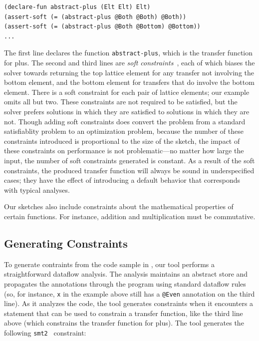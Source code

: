\documentclass[10pt,conference]{IEEEtran}
\begin{document}
\lstset{language=[]Lisp}
\begin{lstlisting}[columns=fullflexible]
(declare-fun abstract-plus (Elt Elt) Elt)
(assert-soft (= (abstract-plus @Both @Both) @Both))
(assert-soft (= (abstract-plus @Both @Bottom) @Bottom))
...
\end{lstlisting}
\lstset{language=C}

The first line declares the function \lstinline{abstract-plus}, which
is the transfer function for plus. The second and third lines are
\textit{soft constraints}~\cite{bjorner2015nuz},
each of which biases the solver towards returning the top lattice
element for any transfer not involving the bottom element, and the
bottom element for transfers that do involve the bottom element.
There is a soft constraint for each pair of lattice elements; our
example omits all but two.  These constraints are not required to be
satisfied, but the solver prefers solutions in which they are
satisfied to solutions in which they are not.  Though adding soft
constraints does convert the problem from a standard satisfiablity
problem to an optimization problem, because the number of these
constraints introduced is proportional to the size of the sketch, the
impact of these constraints on performance is not problematic---no
matter how large the input, the number of soft constraints generated
is constant.  As a result of the soft constraints, the produced
transfer function will always be sound in underspecified cases; they
have the effect of introducing a default behavior that corresponds
with typical analyses.

Our sketches also include constraints about the mathematical properties
of certain functions. For instance, addition and multiplication must
be commutative.

\subsection{Generating Constraints}
\label{sec-cgen}

To generate contraints from the code sample in ,
our tool
performs a straightforward dataflow analysis. The analysis
maintains an abstract store and propagates the annotations
through the program using standard dataflow rules (so, for
instance, \lstinline{x} in the example above still has
a \lstinline{@Even} annotation on the third line).
As it analyzes the code, the tool generates
constraints when it encounters a statement that
can be used to constrain a transfer function, like
the third line above (which constrains the transfer function
for plus). The tool generates
the following \lstinline{smt2}~\cite{smt2} constraint:
\end{document}
